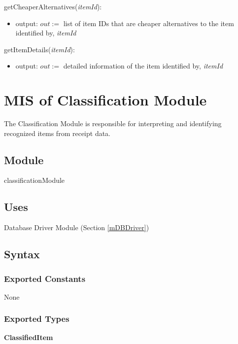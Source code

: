 \documentclass[12pt, titlepage]{article}
\begin{document}
\noindent getCheaperAlternatives(\textit{itemId}):
\begin{itemize}
  \item output: $out :=$ list of item IDs that are cheaper alternatives to the item identified by, \textit{itemId}
\end{itemize}

\noindent getItemDetails(\textit{itemId}):
\begin{itemize}
  \item output: $out :=$ detailed information of the item identified by, \textit{itemId}
\end{itemize}

\newpage

\section{MIS of Classification Module} \label{mClassification}

The Classification Module is responsible for interpreting and identifying recognized items from receipt data.

\subsection{Module}

classificationModule

\subsection{Uses}

Database Driver Module (Section \ref{mDBDriver})

\subsection{Syntax}

\subsubsection{Exported Constants}

None

\subsubsection{Exported Types}

\textbf{ClassifiedItem}
\end{document}
